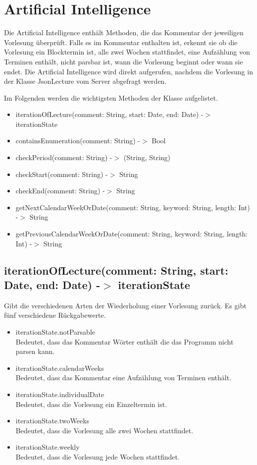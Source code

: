 \chapter{Artificial Intelligence}
Die Artificial Intelligence enthält Methoden, die das Kommentar der jeweiligen Vorlesung überprüft. Falls es im Kommentar enthalten ist, erkennt sie ob die Vorlesung ein Blocktermin ist, alle zwei Wochen stattfindet, eine Aufzählung von Terminen enthält, nicht parsbar ist, wann die Vorlesung beginnt oder wann sie endet. Die Artificial Intelligence wird direkt aufgerufen, nachdem die Vorlesung in der Klasse JsonLecture vom Server abgefragt werden.

Im Folgenden werden die wichtigsten Methoden der Klasse aufgelistet.
\begin{itemize}
     \item iterationOfLecture(comment: String, start: Date, end: Date) -$>$ iterationState
     \item containsEnumeration(comment: String) -$>$ Bool
     \item checkPeriod(comment: String) -$>$ (String, String)
     \item checkStart(comment: String) -$>$ String
     \item checkEnd(comment: String) -$>$ String
     \item getNextCalendarWeekOrDate(comment: String, keyword: String, length: Int) -$>$ String     
     \item getPreviousCalendarWeekOrDate(comment: String, keyword: String, length: Int) -$>$ String
\end{itemize}

\section{iterationOfLecture(comment: String, start: Date, end: Date) -$>$ iterationState}
Gibt die verschiedenen Arten der Wiederholung einer Vorlesung zurück. Es gibt fünf verschiedene Rückgabewerte.
\begin{itemize}
     \item iterationState.notParsable  \\[0.5em]
     Bedeutet, dass das Kommentar Wörter enthält die das Programm nicht parsen kann.
     \item iterationState.calendarWeeks \\[0.5em]
     Bedeutet, dass das Kommentar eine Aufzählung von Terminen enthält.
     \item iterationState.individualDate \\[0.5em]
     Bedeutet, dass die Vorlesung ein Einzeltermin ist.
     \item iterationState.twoWeeks \\[0.5em]
     Bedeutet, dass die Vorlesung alle zwei Wochen stattfindet.
     \item iterationState.weekly \\[0.5em]
     Bedeutet, dass die Vorlesung jede Wochen stattfindet.
\end{itemize}

